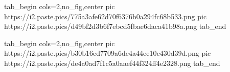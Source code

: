  
 
 
 
 
\zzSecCmtScr

\ifcmt
  tab_begin cols=2,no_fig,center
     pic https://i2.paste.pics/775a3afe62d70f6376b0a294fc68b533.png
		 pic https://i2.paste.pics/d49bf2d3b6f7ebcd5fbae6daca41b98a.png
  tab_end
\fi

\ifcmt
  tab_begin cols=2,no_fig,center
     pic https://i2.paste.pics/b30b16ed7709a6de4a44ee10c430d39d.png
     pic https://i2.paste.pics/de4a0ad7f1c5a0aaef44f324ff4e2328.png
  tab_end
\fi
